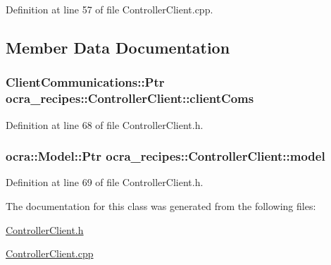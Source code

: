 Definition at line 57 of file Controller\+Client.\+cpp.



\subsection{Member Data Documentation}
\subsubsection[{\texorpdfstring{client\+Coms}{clientComs}}]{\setlength{\rightskip}{0pt plus 5cm}Client\+Communications\+::\+Ptr ocra\+\_\+recipes\+::\+Controller\+Client\+::client\+Coms\hspace{0.3cm}{\ttfamily [protected]}}\hypertarget{classocra__recipes_1_1ControllerClient_aced7fa4d435e58cc2832abdbad1e4cbd}{}\label{classocra__recipes_1_1ControllerClient_aced7fa4d435e58cc2832abdbad1e4cbd}


Definition at line 68 of file Controller\+Client.\+h.

\subsubsection[{\texorpdfstring{model}{model}}]{\setlength{\rightskip}{0pt plus 5cm}ocra\+::\+Model\+::\+Ptr ocra\+\_\+recipes\+::\+Controller\+Client\+::model\hspace{0.3cm}{\ttfamily [protected]}}\hypertarget{classocra__recipes_1_1ControllerClient_a7eab32e91df97360c4de86f968a943e6}{}\label{classocra__recipes_1_1ControllerClient_a7eab32e91df97360c4de86f968a943e6}


Definition at line 69 of file Controller\+Client.\+h.



The documentation for this class was generated from the following files\+:\begin{DoxyCompactItemize}
\item 
\hyperlink{ControllerClient_8h}{Controller\+Client.\+h}\item 
\hyperlink{ControllerClient_8cpp}{Controller\+Client.\+cpp}\end{DoxyCompactItemize}
